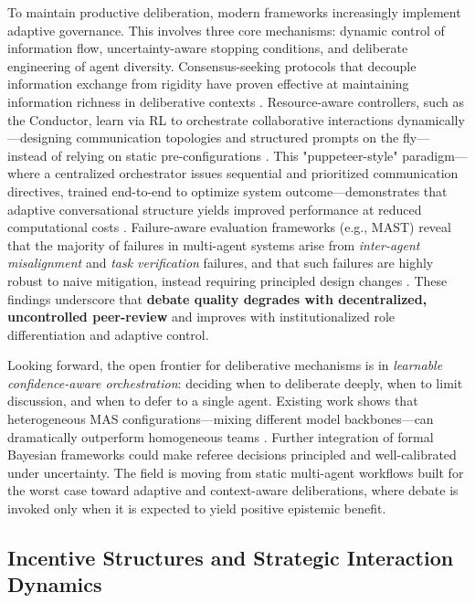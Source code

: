 \documentclass[11pt,a4paper]{article}
\begin{document}
To maintain productive deliberation, modern frameworks increasingly implement adaptive governance. This involves three core mechanisms: dynamic control of information flow, uncertainty-aware stopping conditions, and deliberate engineering of agent diversity. Consensus-seeking protocols that decouple information exchange from rigidity have proven effective at maintaining information richness in deliberative contexts \cite{arxiv:2310.20151v2}. Resource-aware controllers, such as the Conductor, learn via RL to orchestrate collaborative interactions dynamically---designing communication topologies and structured prompts on the fly---instead of relying on static pre-configurations \cite{arxiv:2512.04388v5}. This "puppeteer-style" paradigm---where a centralized orchestrator issues sequential and prioritized communication directives, trained end-to-end to optimize system outcome---demonstrates that adaptive conversational structure yields improved performance at reduced computational costs \cite{arxiv:2505.19591v2}. Failure-aware evaluation frameworks (e.g., MAST) reveal that the majority of failures in multi-agent systems arise from \emph{inter-agent misalignment} and \emph{task verification} failures, and that such failures are highly robust to naive mitigation, instead requiring principled design changes \cite{arxiv:2503.13657v3}. These findings underscore that \textbf{debate quality degrades with decentralized, uncontrolled peer-review} and improves with institutionalized role differentiation and adaptive control.

Looking forward, the open frontier for deliberative mechanisms is in \emph{learnable confidence-aware orchestration}: deciding when to deliberate deeply, when to limit discussion, and when to defer to a single agent. Existing work shows that heterogeneous MAS configurations---mixing different model backbones---can dramatically outperform homogeneous teams \cite{arxiv:2505.16997v1}. Further integration of formal Bayesian frameworks could make referee decisions principled and well-calibrated under uncertainty. The field is moving from static multi-agent workflows built for the worst case toward adaptive and context-aware deliberations, where debate is invoked only when it is expected to yield positive epistemic benefit.


\subsection{Incentive Structures and Strategic Interaction Dynamics}
\end{document}
